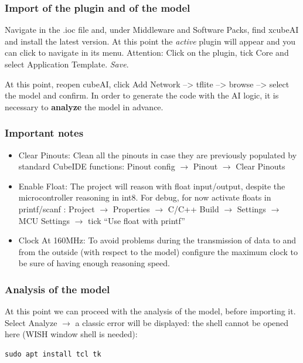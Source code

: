 \subsubsection{Import of the plugin and of the model}
Navigate in the .ioc file and, under Middleware and Software Packs, find xcubeAI and install the latest version. At this point the \textit{active} plugin will appear and you can click to navigate in its menu. Attention: Click on the plugin, tick Core and select Application Template. \textit{Save}.

At this point, reopen cubeAI, click Add Network --> tflite --> browse --> select the model and confirm. In order to generate the code with the AI logic, it is necessary to \textbf{analyze} the model in advance.

\subsubsection{Important notes}
\begin{itemize}
    \item Clear Pinouts: Clean all the pinouts in case they are previously populated by standard CubeIDE functions: Pinout config $\rightarrow$ Pinout $\rightarrow$ Clear Pinouts
    \item Enable Float: The project will reason with float input/output, despite the microcontroller reasoning in int8. For debug, for now activate floats in printf/scanf : Project $\rightarrow$ Properties $\rightarrow$ C/C++ Build $\rightarrow$ Settings $\rightarrow$ MCU Settings $\rightarrow$ tick “Use float with printf”
    \item Clock At 160MHz: To avoid problems during the transmission of data to and from the outside (with respect to the model) configure the maximum clock to be sure of having enough reasoning speed.
\end{itemize}

\subsubsection{Analysis of the model}
At this point we can proceed with the analysis of the model, before importing it. Select Analyze $\rightarrow$ a classic error will be displayed: the shell cannot be opened here (WISH window shell is needed):

\begin{verbatim}
sudo apt install tcl tk
\end{verbatim}

